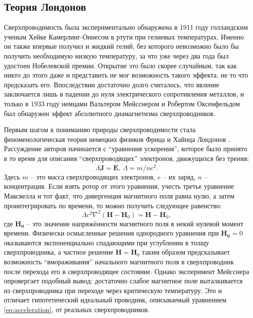 \documentclass[14pt, a4paper]{extreport}
\numberwithin{equation}{section}
\begin{document}
\subsection{Теория Лондонов}

Сверхпроводимость была экспериментально обнаружена в 1911 году голландским ученым Хейке Камерлинг-Оннесом в ртути при гелиевых температурах. Именно он также впервые получил и жидкий гелий, без которого невозможно было бы получить необходимую низкую температуру, за что уже через два года был удостоен Нобелевской премии. Открытие это было скорее случайным, так как никто до этого даже и представить не мог возможность такого эффекта, не то что предсказать его. Впоследствии достаточно долго считалось, что явление заключается лишь в падении до нуля электрического сопротивления металлов, и только в 1933 году немцами Вальтером Мейсснером и Робертом Оксенфельдом был обнаружен эффект абсолютного диамагнетизма сверхпроводников. 

Первым шагом к пониманию природы сверхпроводимости стала феноменологическая теория немецких физиков Фрица и Хайнца Лондонов \cite{london1935electromagnetic}. Рассуждение авторов начинается с ``уравнения ускорения'', которое было принято в то время для описания ``сверхпроводящих'' электронов, движущихся без трения:
\begin{equation}
	\Lambda \dot{\mathbf{J}} = \mathbf{E},\ \Lambda = m/ne^2. \label{eq:acceleration}
\end{equation}
Здесь $m$ -- это масса сверхпроводящих электронов, $e$ -- их заряд, $n$ -- концентрация. Если взять ротор от этого уравнения, учесть третье уравнение Максвелла и тот факт, что дивергенция магнитного поля равна нулю, а затем проинтегрировать по времени, то можно получить следующее равенство:
\begin{equation}
	\Lambda c^2 \nabla^2 (\mathbf{H}-\mathbf{H}_0) = \mathbf{H} - \mathbf{H}_0,\label{eq:london_inhomogeneous}
\end{equation}
где $\mathbf{H_0}$ -- это значение напряжённости магнитного поля в некий нулевой момент времени. Физически осмысленные решения однородного уравнения при $\mathbf{H_0} = 0$ оказываются экспоненциально спадающими при углублении в толщу сверхпроводника, а частное решение $\mathbf{H} = \mathbf{H}_0$ таким образом предсказывает возможность ``вмораживания'' начального магнитного поля в сверхпроводник после перехода его в сверхпроводящее состояние. Однако эксперимент Мейсснера опровергает подобный вывод: достаточно слабое магнитное поле выталкивается из сверхпроводника при переходе через критическую температуру. Это и отличает гипотетический идеальный проводник, описываемый уравнением \eqref{eq:acceleration}, от реальных сверхпроводников.
\end{document}

